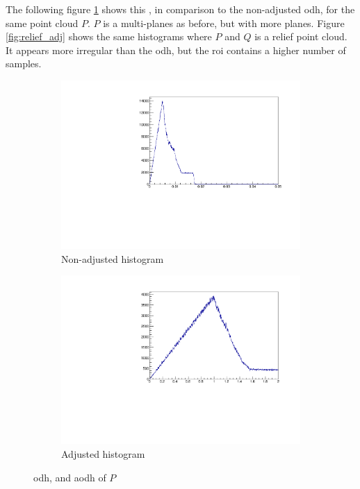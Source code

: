 The following figure \ref{fig:disks_adj} shows this , in comparison to the non-adjusted \gls{odh}, for the same point cloud $P$. $P$ is a multi-planes as before, but with more planes. Figure \ref{fig:relief_adj} shows the same histograms where $P$ and $Q$ is a relief point cloud. It appears more irregular than the \gls{odh}, but the \gls{roi} contains a higher number of samples.
\begin{figure}[H]
\begin{subfigure}{.5\textwidth}
	\includegraphics[width=\linewidth]{fig/disks_noadj.pdf}
	\caption{Non-adjusted histogram}
\end{subfigure}%
\begin{subfigure}{.5\textwidth}
	\includegraphics[width=\linewidth]{fig/disks_adj.pdf}
	\caption{Adjusted histogram}
\end{subfigure}
\caption{\Gls{odh}, and \gls{aodh} of $P$}
\label{fig:disks_adj}
\end{figure}


